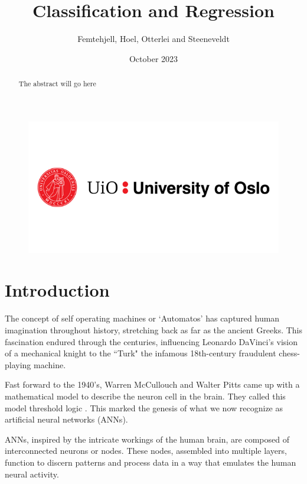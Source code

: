 \documentclass{article}
\title{Classification and Regression}
\author{Femtehjell, Hoel, Otterlei and Steeneveldt}
\date{October 2023}
\theoremstyle{definition}
\begin{document}

\maketitle
\begin{figure}[H]
    \centering
    \includegraphics[scale=0.5]{1797261_uio-logo.png}
\end{figure}
\newpage
\tableofcontents
\listoffigures


\newpage

\begin{abstract}
    The abstract will go here
\end{abstract}

\section{Introduction}
The concept of self operating machines or `Automatos' has captured human imagination throughout history, stretching back as far as the ancient Greeks. This fascination endured through the centuries, influencing Leonardo DaVinci's vision of a mechanical knight to the ``Turk"
the infamous 18th-century fraudulent chess-playing machine.

Fast forward to the 1940's, Warren McCullouch and Walter Pitts came up with a mathematical model to describe the neuron cell in the brain. They called this model threshold logic \parencite{mcculloch1943logical}. This marked the genesis of what we now recognize as artificial neural networks (ANNs).

ANNs, inspired by the intricate workings of the human brain, are composed of interconnected neurons or nodes. These nodes, assembled into multiple layers, function to discern patterns and process data in a way that emulates the human neural activity.
\end{document}
